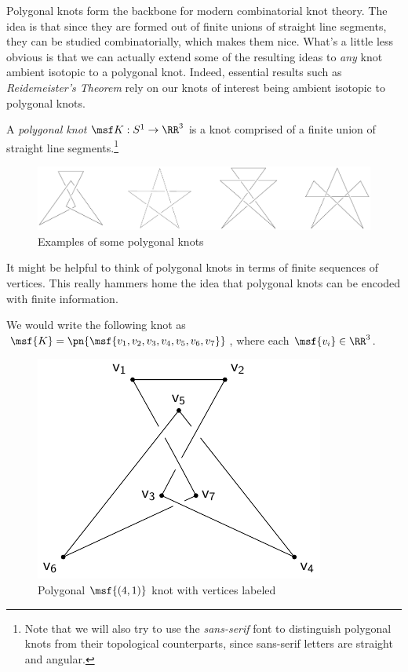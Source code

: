 Polygonal knots form the backbone for modern combinatorial knot
theory. The idea is that since they are formed out of finite unions of
straight line segments, they can be studied combinatorially, which
makes them nice. What's a little less obvious is that we can actually
extend some of the resulting ideas to \emph{any} knot ambient isotopic
to a polygonal knot. Indeed, essential results such as
\emph{Reidemeister's Theorem} rely on our knots of interest being
ambient isotopic to polygonal knots.
\begin{definition}
  A \emph{polygonal knot} $\msf K : S^1 \to \RR^3$ is a knot comprised
  of a finite union of straight line segments.\footnote{Note that we
    will also try to use the \emph{sans-serif} font to distinguish
    polygonal knots from their topological counterparts, since
    sans-serif letters are straight and angular.}
\end{definition}
\begin{figure}[H]
  \centering
  \includegraphics[width=\linewidth]{figures/polygonal-knots/ex-polyknots.pdf}
  \caption{Examples of some polygonal knots}
\end{figure}
It might be helpful to think of polygonal knots in terms of finite
sequences of vertices. This really hammers home the idea that
polygonal knots can be encoded with finite information.
\begin{example}
  We would write the following knot as $\msf{K} = \pn{\msf{v_1, v_2,
      v_3, v_4, v_5, v_6, v_7}}$, where each $\msf{v_i} \in \RR^3$.
  \begin{figure}[H]
    \centering
    \includegraphics{figures/polygonal-knots/4-1-labeled.pdf}
    \caption[Labeled polygonal $\msf{(4,1)}$]{Polygonal $\msf{(4,1)}$
      knot with vertices labeled} \qedhere
  \end{figure}
\end{example}
